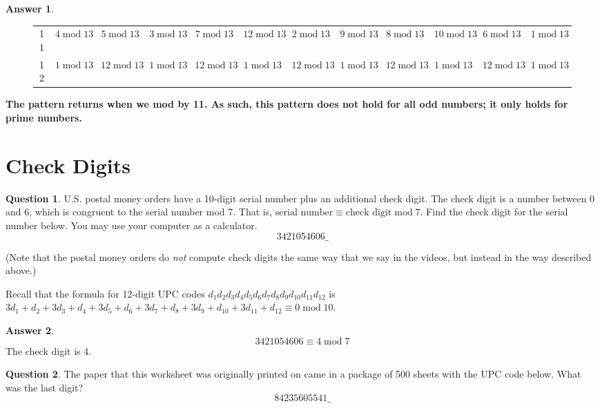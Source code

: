 \documentclass[article, 12pt]{article}
\theoremstyle{definition}
\newtheorem{question}{Question}
\newtheorem{answer}{Answer}
\newcommand{\Mod}[1]{\;\mathrm{mod}\; #1} %
\begin{document}
\begin{answer}
\begin{figure}[H]
{\begin{tabular}{|c|c|c|c|c|c|c|c|c|c|c|c|}
                11 & $4 \Mod {13}$ & $5 \Mod {13}$ & $3 \Mod {13}$ & $7 \Mod {13}$ & $12 \Mod {13}$ & $2 \Mod {13}$ & $9 \Mod {13}$ & $8 \Mod {13}$ & $10 \Mod {13}$ & $6 \Mod {13}$ & $1 \Mod {13}$ \\
                12 & $1 \Mod {13}$ & $12 \Mod {13}$ & $1 \Mod {13}$ & $12 \Mod {13}$ & $1 \Mod {13}$ & $12 \Mod {13}$ & $1 \Mod {13}$ & $12 \Mod {13}$ & $1 \Mod {13}$ & $12 \Mod {13}$ & $1 \Mod {13}$ \\
                \hline
            \end{tabular}}
        \end{figure}
        \textbf{The pattern returns when we mod by 11. As such, this pattern does not hold for all odd numbers; it only holds for prime numbers.}
    \end{answer}
    \section{Check Digits}
    \begin{question}
        U.S. postal money orders have a 10-digit serial number plus an additional check digit. The check digit is a number between 0 and 6, which is congruent to the serial number mod 7. That is, $\text{serial number} \equiv \text{check digit} \Mod{7}$. Find the check digit for the serial number below. You may use your computer as a calculator.
        \[ 3421054606\_ \]
    \end{question}
    (Note that the postal money orders do \textit{not} compute check digits the same way that we say in the videos, but instead in the way described above.)

    Recall that the formula for 12-digit UPC codes $d_1d_2d_3d_4d_5d_6d_7d_8d_9d_{10}d_{11}d_{12}$ is $3d_1 + d_2 + 3d_3 + d_4 + 3d_5 + d_6 + 3d_7 + d_8 + 3d_9 + d_{10} + 3d_{11} + d_{12} \equiv 0 \Mod{10}$.

    \begin{answer}
        \[ 3421054606 \equiv 4 \Mod{7} \]
        \pushQED{\qed} The check digit is 4.   \qedhere 
    \end{answer}

    \begin{question}
        The paper that this worksheet was originally printed on came in a package of 500 sheets with the UPC code below. What was the last digit?
        \[ 84235605541\_ \]
    \end{question}
\end{document}
